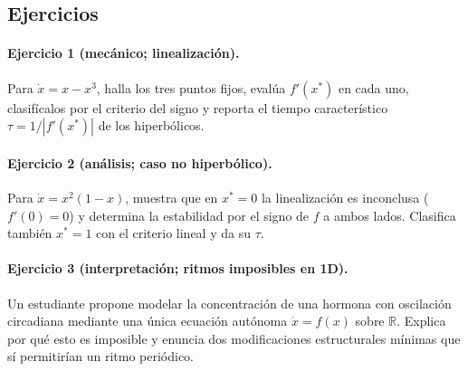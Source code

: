 \subsection{Ejercicios}

\paragraph{Ejercicio 1 (mecánico; linealización).} Para $\dot{x} = x - x^3$, halla los tres puntos fijos, evalúa $f'(x^*)$ en cada uno, clasifícalos por el criterio del signo y reporta el tiempo característico $\tau=1/|f'(x^*)|$ de los hiperbólicos.

\paragraph{Ejercicio 2 (análisis; caso no hiperbólico).} Para $\dot{x} = x^2(1-x)$, muestra que en $x^*=0$ la linealización es inconclusa ($f'(0)=0$) y determina la estabilidad por el signo de $f$ a ambos lados. Clasifica también $x^*=1$ con el criterio lineal y da su $\tau$.

\paragraph{Ejercicio 3 (interpretación; ritmos imposibles en 1D).} Un estudiante propone modelar la concentración de una hormona con oscilación circadiana mediante una única ecuación autónoma $\dot{x}=f(x)$ sobre $\mathbb{R}$. Explica por qué esto es imposible y enuncia dos modificaciones estructurales mínimas que sí permitirían un ritmo periódico.

